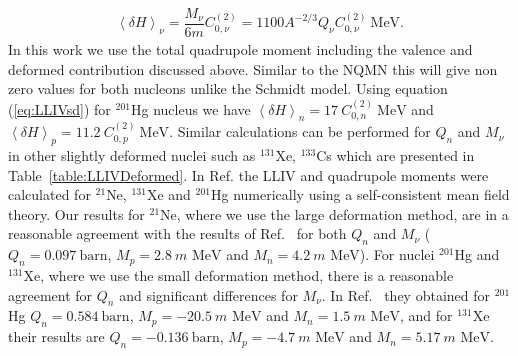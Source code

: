 \documentclass[10pt,a4paper, twoside, openright]{report}
\begin{document}
\begin{align} \label{eq:LLIVsd}
\left<\delta H\right>_{\nu} = \dfrac{M_\nu}{6m} C_{0, \nu}^{(2)} = 1100A^{-2/3}Q_{\nu} C_{0, \nu}^{(2)} \ \text{MeV}.
\end{align}
In this work we use the total quadrupole moment including the valence and deformed contribution discussed above. Similar to the NQMN this will give non zero values for both nucleons unlike the Schmidt model. Using equation (\ref{eq:LLIVsd}) for $^{201}$Hg nucleus we have $\left<\delta H\right>_{n} = 17 \ C_{0, n}^{(2)} \ \text{MeV}$ and $\left<\delta H\right>_{p} = 11.2 \ C_{0, p}^{(2)} \ \text{MeV}$. Similar calculations can be performed for $Q_n$ and $M_{\nu}$ in other slightly deformed nuclei such as $^{131}$Xe, $^{133}$Cs which are presented in Table~\ref{table:LLIVDeformed}. In Ref. \cite{Brown2016} the LLIV and quadrupole moments were calculated for $^{21}$Ne, $^{131}$Xe and $^{201}$Hg numerically using a self-consistent mean field theory. 
Our results for $^{21}$Ne, where we  use the large deformation method, are in a reasonable agreement  with the results of Ref.~\cite{Brown2016} for both $Q_{n}$ and $M_{\nu}$ ($Q_n = 0.097 \ \text{barn}$, $M_{p} = 2.8 \ m\text{ MeV}$ and $M_n = 4.2 \ m\text{ MeV}$). For nuclei  $^{201}$Hg  and $^{131}$Xe, where we use the small deformation method, there is a reasonable agreement for $Q_n$ and significant differences for $M_{\nu}$. In Ref.~\cite{Brown2016}  they obtained for $^{201}$Hg  $Q_n = 0.584 \ \text{barn}$, $M_{p} = -20.5 \ m\text{ MeV}$ and $M_n = 1.5 \ m\text{ MeV}$,  and for $^{131}$Xe their results are $Q_n = -0.136 \ \text{barn}$, $M_{p} = -4.7 \ m\text{ MeV}$ and $M_n = 5.17 \ m\text{ MeV}$.
\end{document}
